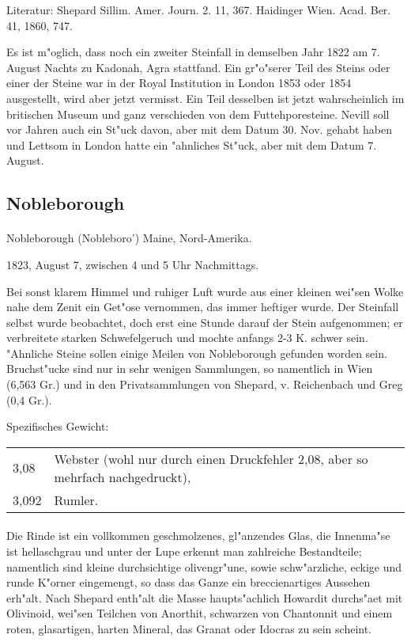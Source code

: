 \documentclass[a4paper, 11pt, oneside]{article}
\begin{document}
Literatur: Shepard Sillim. Amer. Journ. 2. 11, 367. Haidinger Wien. Acad. Ber. 41, 1860, 747.

Es ist m"oglich, dass noch ein zweiter Steinfall in demselben Jahr 1822 am 7. August Nachts zu Kadonah, Agra stattfand. Ein gr"o"serer Teil des Steins oder einer der Steine war in der Royal Institution in London 1853 oder 1854 ausgestellt, wird aber jetzt vermisst. Ein Teil desselben ist jetzt wahrscheinlich im britischen Museum und ganz verschieden von dem Futtehporesteine. Nevill soll vor Jahren auch ein St"uck davon, aber mit dem Datum 30. Nov. gehabt haben und Lettsom in London hatte ein "ahnliches St"uck, aber mit dem Datum 7. August.

\subsection{Nobleborough}
\normalsize
\paragraph{}
Nobleborough (Nobleboro') Maine, Nord-Amerika.

1823, August 7, zwischen 4 und 5 Uhr Nachmittags.

Bei sonst klarem Himmel und ruhiger Luft wurde aus einer kleinen wei"sen Wolke nahe dem Zenit ein Get"ose vernommen, das immer heftiger wurde. Der Steinfall selbst wurde beobachtet, doch erst eine Stunde darauf der Stein aufgenommen; er verbreitete starken Schwefelgeruch und mochte anfangs 2-3 K. schwer sein. "Ahnliche Steine sollen einige Meilen von Nobleborough gefunden worden sein. Bruchst"ucke sind nur in sehr wenigen Sammlungen, so namentlich in Wien (6,563 Gr.) und in den Privatsammlungen von Shepard, v. Reichenbach und Greg (0,4 Gr.).

Spezifisches Gewicht:
\begin{table}[!ht]
    \centering
    \begin{tabular}{l l}
        3,08 & Webster (wohl nur durch einen Druckfehler 2,08, aber so mehrfach nachgedruckt),\\
        3,092 & Rumler.
    \end{tabular}
\end{table}
\paragraph{}
Die Rinde ist ein vollkommen geschmolzenes, gl"anzendes Glas, die Innenma"se ist hellaschgrau und unter der Lupe erkennt man zahlreiche Bestandteile; namentlich sind kleine durchsichtige olivengr"une, sowie schw"arzliche, eckige und runde K"orner eingemengt, so dass das Ganze ein breccienartiges Aussehen erh"alt. Nach Shepard enth"alt die Masse haupts"achlich Howardit durchs"aet mit Olivinoid, wei"sen Teilchen von Anorthit, schwarzen von Chantonnit und einem roten, glasartigen, harten Mineral, das Granat oder Idocras zu sein scheint.
\end{document}
